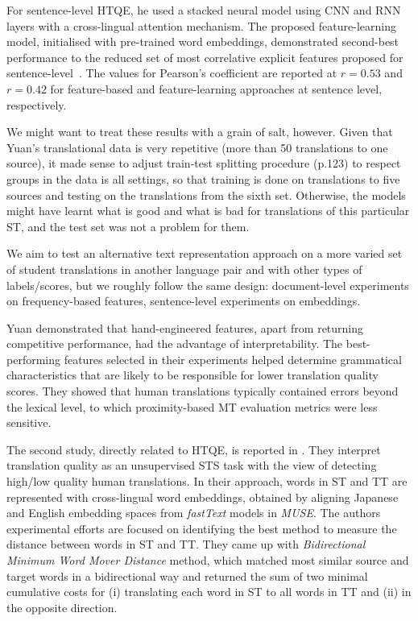 For sentence-level \gls*{HTQE}, he used a stacked neural model using \gls{CNN} and \gls{RNN} layers with a cross-lingual attention mechanism.
The proposed feature-learning model, initialised with pre-trained word embeddings, demonstrated second-best performance to the reduced set of most correlative explicit features proposed for sentence-level~\cite[see Table 7.3 Sentence-level \gls*{HTQE} results][p.160]{Yuan2018}. The values for Pearson's coefficient are reported at $r=0.53$ and $r=0.42$ for feature-based and feature-learning approaches at sentence level, respectively. 

We might want to treat these results with a grain of salt, however. Given that Yuan's translational data is very repetitive (more than 50 translations to one source), it made sense to adjust train-test splitting procedure (p.123) to respect groups in the data is all settings, so that training is done on translations to five sources and testing on the translations from the sixth set. Otherwise, the models might have learnt what is good and what is bad for translations of this particular ST, and the test set was not a problem for them. 

We aim to test an alternative text representation approach on a more varied set of student translations in another language pair and with other types of labels/scores, but we roughly follow the same design: document-level experiments on frequency-based features, sentence-level experiments on embeddings.

Yuan demonstrated that hand-engineered features, apart from returning competitive performance, had the advantage of interpretability. The best-performing features selected in their experiments helped determine grammatical characteristics that are likely to be responsible for lower translation quality scores. They showed that human translations typically contained errors beyond the lexical level, to which proximity-based MT evaluation metrics were less sensitive.


The second study, directly related to HTQE, is reported in \citet{Zhou2019}. They interpret translation quality as an unsupervised \gls{STS} task with the view of detecting high/low quality human translations. In their approach, words in ST and TT are represented with cross-lingual word embeddings, obtained by aligning Japanese and English embedding spaces from \textit{fastText} models in \textit{MUSE}. The authors experimental efforts are focused on identifying the best method to measure the distance between words in ST and TT. They came up with \textit{Bidirectional Minimum Word Mover Distance} method, which matched most similar source and target words in a bidirectional way and returned the sum of two minimal cumulative costs for (i) translating each word in ST to all words in TT and (ii) in the opposite direction. 

